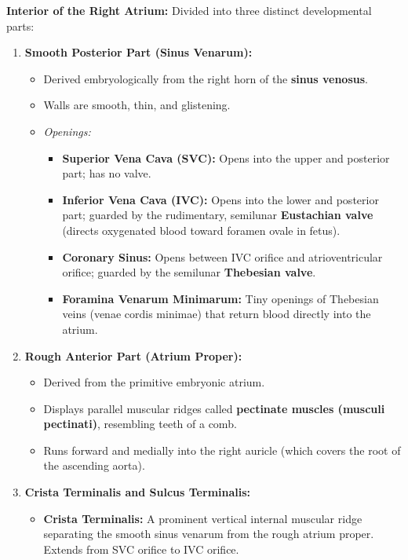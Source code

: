 \documentclass[11pt,a4paper]{article}
\begin{document}
\begin{ansbox}
\textbf{Interior of the Right Atrium:}
Divided into three distinct developmental parts:
\begin{enumerate}[leftmargin=*]
    \item \textbf{Smooth Posterior Part (Sinus Venarum):}
    \begin{itemize}
        \item Derived embryologically from the right horn of the \textbf{sinus venosus}.
        \item Walls are smooth, thin, and glistening.
        \item \textit{Openings:}
        \begin{itemize}
            \item \textbf{Superior Vena Cava (SVC):} Opens into the upper and posterior part; has no valve.
            \item \textbf{Inferior Vena Cava (IVC):} Opens into the lower and posterior part; guarded by the rudimentary, semilunar \textbf{Eustachian valve} (directs oxygenated blood toward foramen ovale in fetus).
            \item \textbf{Coronary Sinus:} Opens between IVC orifice and atrioventricular orifice; guarded by the semilunar \textbf{Thebesian valve}.
            \item \textbf{Foramina Venarum Minimarum:} Tiny openings of Thebesian veins (venae cordis minimae) that return blood directly into the atrium.
        \end{itemize}
    \end{itemize}
    \item \textbf{Rough Anterior Part (Atrium Proper):}
    \begin{itemize}
        \item Derived from the primitive embryonic atrium.
        \item Displays parallel muscular ridges called \textbf{pectinate muscles (musculi pectinati)}, resembling teeth of a comb.
        \item Runs forward and medially into the right auricle (which covers the root of the ascending aorta).
    \end{itemize}
    \item \textbf{Crista Terminalis and Sulcus Terminalis:}
    \begin{itemize}
        \item \textbf{Crista Terminalis:} A prominent vertical internal muscular ridge separating the smooth sinus venarum from the rough atrium proper. Extends from SVC orifice to IVC orifice.

\end{itemize}
\end{enumerate}
\end{ansbox}
\end{document}
